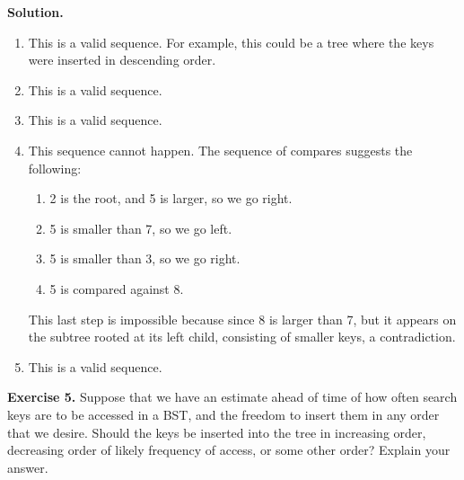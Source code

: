 \documentclass[12pt, a4paper]{article}
\newenvironment{ex}[2][Exercise]
{\par\medskip\noindent \textbf{#1 #2.}}
{\medskip}
\newenvironment{sol}[1][Solution]
{\par\medskip\noindent \textbf{#1.} }
{\medskip}
\begin{document}
	\begin{sol}
		\begin{enumerate}[label=(\alph*)]
			\item This is a valid sequence. For example, this could be a tree where the
			keys were inserted in descending order.
			\item This is a valid sequence.
			\item This is a valid sequence.
			\item This sequence cannot happen. The sequence of compares suggests the following:
			\begin{enumerate}[label=(\roman*)]
				\item 2 is the root, and 5 is larger, so we go right.
				\item 5 is smaller than 7, so we go left.
				\item 5 is smaller than 3, so we go right.
				\item 5 is compared against 8.
			\end{enumerate}
			This last step is impossible because since 8 is larger than 7, but it
			appears on the subtree rooted at its left child, consisting of smaller
			keys,  a contradiction.
			\item This is a valid sequence.
		\end{enumerate}
	\end{sol}
		\begin{ex}{5}
		Suppose that we have an estimate ahead of time of how often search keys are
		to be accessed in a BST, and the freedom to insert them in any order that we
		desire. Should the keys be inserted into the tree in increasing order, decreasing
		order of likely frequency of access, or some other order? Explain your answer.
	\end{ex}
\end{document}
